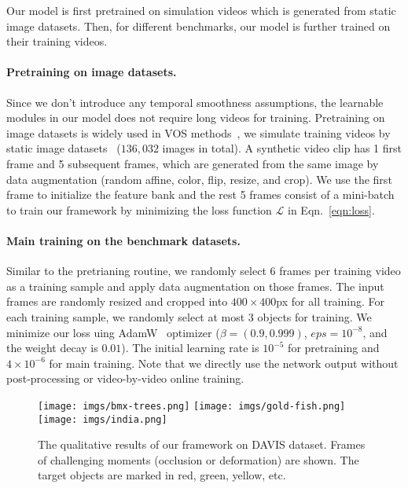 \documentclass{article}
\begin{document}
Our model is first pretrained on simulation videos which is generated from static image datasets.
Then, for different benchmarks, our model is further trained on their training videos.

\paragraph{Pretraining on image datasets.} 
Since we don't introduce any temporal smoothness assumptions, the learnable modules in our model does not require long videos for training. 
Pretraining on image datasets is widely used in VOS methods~\cite{Perazzi2017, oh_video_2019}, we simulate training videos by static image datasets~\cite{ChengPAMI, shi2015hierarchical, li2014secrets, lin2014microsoft, everingham2010pascal} ($136,032$ images in total).
A synthetic video clip has 1 first frame and 5 subsequent frames, which are generated from the same image by data augmentation (random affine, color, flip, resize, and crop).
We use the first frame to initialize the feature bank and the rest 5 frames consist of a mini-batch to train our framework by minimizing the loss function $\mathcal{L}$ in Eqn.~\ref{eqn:loss}.

\paragraph{Main training on the benchmark datasets.}
Similar to the pretrianing routine, we randomly select 6 frames per training video as a training sample and apply data augmentation on those frames.
The input frames are randomly resized and cropped into $400 \times 400$px for all training.
For each training sample, we randomly select at most 3 objects for training.
We minimize our loss uing AdamW~\cite{loshchilov2017decoupled} optimizer ($\beta=(0.9, 0.999)$, $eps=10^{-8}$, and the weight decay is $0.01$).
The initial learning rate is $10^{-5}$ for pretraining and $4\times 10^{-6}$ for main training.
Note that we directly use the network output without post-processing or video-by-video online training.

\begin{figure}[h!tb]
    \centering
    \texttt{[image: imgs/bmx-trees.png]}
    \texttt{[image: imgs/gold-fish.png]}
    \texttt{[image: imgs/india.png]}
    \caption{The qualitative results of our framework on DAVIS dataset. Frames of challenging moments (occlusion or deformation) are shown. The target objects are marked in red, green, yellow, etc.}
    \label{fig:qualitative}
\end{figure}
\end{document}
